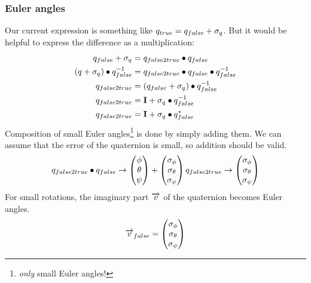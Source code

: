 \subsubsection*{Euler angles}
Our current expression is something like $ q_{true} = q_{false} + \sigma_{q_{}} $. But it would be helpful to express the difference as a multiplication:
\begin{align}
q_{false} + \sigma_{q_{}} 				&= q_{false2true} \bullet q_{false} \\
(q_{} + \sigma_{q_{}}) \bullet q_{false}^{-1} &= q_{false2true} \bullet q_{false} \bullet q_{false}^{-1}	\\
q_{false2true} &= (q_{false} + \sigma_{q_{}}) \bullet q_{false}^{-1}	\\
q_{false2true} &= \mathbf{I} + \sigma_{q_{}} \bullet q_{false}^{-1}  	\\
q_{false2true} &= \mathbf{I} + \sigma_{q_{}} \bullet q_{false}^* \label{equ. false2true}
\end{align}
Composition of small Euler angles\footnote{\emph{only} small Euler angles!} is done by simply adding them. We can assume that the error of the quaternion is small, so addition should be valid.
\begin{equation}
q_{false2true} \bullet q_{false} \rightarrow \begin{pmatrix}\phi \\ \theta \\ \psi \end{pmatrix} + \begin{pmatrix}\sigma_{\phi} \\ \sigma_{\theta} \\ \sigma_{\psi} \end{pmatrix}	\\
q_{false2true} \rightarrow \begin{pmatrix}\sigma_{\phi} \\ \sigma_{\theta} \\ \sigma_{\psi} \end{pmatrix}
\end{equation}
For small rotations, the imaginary part $\overrightarrow{v}$ of the quaternion becomes Euler angles.
\begin{equation}
\overrightarrow{v}_{false} = \begin{pmatrix}\sigma_{\phi} \\ \sigma_{\theta} \\ \sigma_{\psi} \end{pmatrix}	\label{equ. err euler}
\end{equation}
